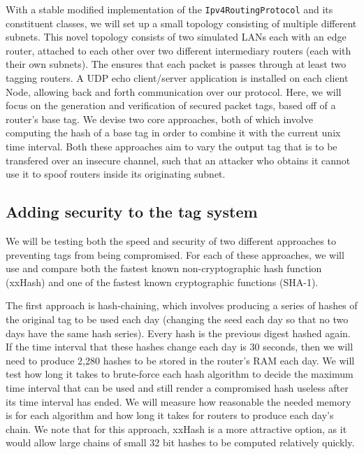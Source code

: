 \documentclass[12pt]{article} %
\newcommand{\prettycode}[1]
{\lstinline[basicstyle=\ttfamily]{#1}}
\begin{document}
With a stable modified implementation of the \prettycode{Ipv4RoutingProtocol} and its constituent classes, we will set up a small topology consisting of multiple different subnets. This novel topology consists of two simulated LANs each with an edge router, attached to each other over two different intermediary routers (each with their own subnets). The ensures that each packet is passes through at least two tagging routers. A UDP echo client/server application is installed on each client Node, allowing back and forth communication over our protocol. Here, we will focus on the generation and verification of secured packet tags, based off of a router's base tag. We devise two core approaches, both of which involve computing the hash of a base tag in order to combine it with the current unix time interval. Both these approaches aim to vary the output tag that is to be transfered over an insecure channel, such that an attacker who obtains it cannot use it to spoof routers inside its originating subnet.

\subsection{Adding security to the tag system}

We will be testing both the speed and security of two different approaches to preventing tags from being compromised. For each of these approaches, we will use and compare both the fastest known non-cryptographic hash function (xxHash\cite{xxhash}) and one of the fastest known cryptographic functions (SHA-1). 

The first approach is hash-chaining, which involves producing a series of hashes of the original tag to be used each day (changing the seed each day so that no two days have the same hash series). Every hash is the previous digest hashed again. If the time interval that these hashes change each day is 30 seconds, then we will need to produce 2,280 hashes to be stored in the router's RAM each day. We will test how long it takes to brute-force each hash algorithm to decide the maximum time interval that can be used and still render a compromised hash useless after its time interval has ended. We will measure how reasonable the needed memory is for each algorithm and how long it takes for routers to produce each day's chain. We note that for this approach, xxHash is a more attractive option, as it would allow large chains of small 32 bit hashes to be computed relatively quickly.
\end{document}
